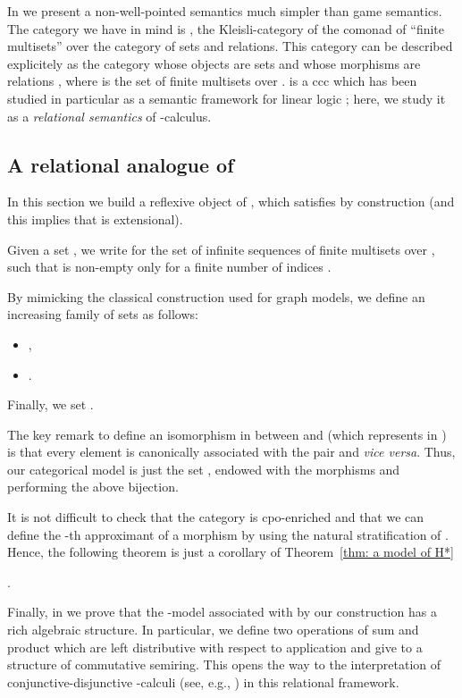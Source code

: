 \documentclass[english]{llncs}
\begin{document}
In \cite[Chapter~3]{ManzonettoTh}  we present a non-well-pointed semantics much simpler than game semantics. 
The category we have in mind is , the Kleisli-category of the comonad of ``finite multisets'' over the category  of sets and relations.
This category can be described explicitely as the category whose objects are sets and whose morphisms  are relations , 
where  is the set of finite multisets over .
 is a ccc which has been studied in particular as a semantic framework for linear logic \cite{Girard88,BucciarelliE01};
here, we study it as a {\em relational semantics} of -calculus.

\subsection{A relational analogue of }

In this section we build a reflexive object  of , which satisfies  by construction 
(and this implies that  is extensional). 

Given a set , we write  for the set of infinite sequences  of finite multisets over ,
such that  is non-empty only for a finite number of indices .

By mimicking the classical construction used for graph models, we define an increasing family of sets  as follows: 
\begin{itemize}
\item ,
\item .
\end{itemize}
Finally, we set .

The key remark to define an isomorphism in  between  and  (which represents  in ) 
is that every element  is canonically associated with the pair  and {\em vice versa}. 
Thus, our categorical model  is just the set , endowed with the morphisms  and  performing 
the above bijection.

It is not difficult to check that the category  is cpo-enriched and that 
we can define the -th approximant  of a morphism  by using the natural stratification of .
Hence, the following theorem is just a corollary of Theorem~\ref{thm: a model of H*}

\begin{theorem} \cite[Cor.~3.3.4]{ManzonettoTh} .
\end{theorem}

Finally, in \cite[Chapter~3]{ManzonettoTh} we prove that the -model  associated with  by our construction
has a rich algebraic structure.
In particular, we define two operations of sum and product which are left distributive with respect to application and 
give to  a structure of commutative semiring. 
This opens the way to the interpretation of conjunctive-disjunctive -calculi (see, e.g., \cite{DezaniLP98}) 
in this relational framework.
\end{document}
